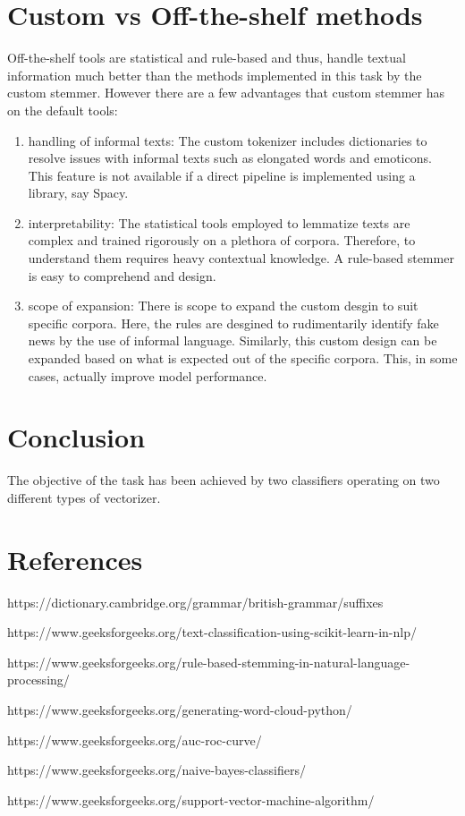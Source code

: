 \documentclass{article}
\begin{document}
\section{Custom vs Off-the-shelf methods}
Off-the-shelf tools are statistical and rule-based and thus, handle textual information much better than the methods implemented in this task by the custom stemmer. However there are a few advantages that custom stemmer has on the default tools:
\begin{enumerate}
    \item handling of informal texts: The custom tokenizer includes dictionaries to resolve issues with informal texts such as elongated words and emoticons. This feature is not available if a direct pipeline is implemented using a library, say Spacy. 
    \item interpretability: The statistical tools employed to lemmatize texts are complex and trained rigorously on a plethora of corpora. Therefore, to understand them requires heavy contextual knowledge. A rule-based stemmer is easy to comprehend and design.
    \item scope of expansion: There is scope to expand the custom desgin to suit specific corpora. Here, the rules are desgined to rudimentarily identify fake news by the use of informal language. Similarly, this custom design can be expanded based on what is expected out of the specific corpora. This, in some cases, actually improve model performance.
\end{enumerate}

\section{Conclusion}
The objective of the task has been achieved by two classifiers operating on two different types of vectorizer.

\section{References}
https://dictionary.cambridge.org/grammar/british-grammar/suffixes

https://www.geeksforgeeks.org/text-classification-using-scikit-learn-in-nlp/

https://www.geeksforgeeks.org/rule-based-stemming-in-natural-language-processing/

https://www.geeksforgeeks.org/generating-word-cloud-python/

https://www.geeksforgeeks.org/auc-roc-curve/

https://www.geeksforgeeks.org/naive-bayes-classifiers/

https://www.geeksforgeeks.org/support-vector-machine-algorithm/
\end{document}
